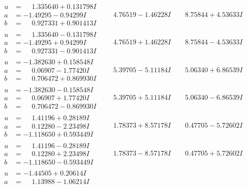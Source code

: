 \documentclass[1p]{elsarticle_modified}
\theoremstyle{definition}
\begin{document}
$$\begin{array}{c|c|c}
\begin{aligned}
u &= \phantom{-}1.335640 + 0.131798 I \\
a &= -1.49295 - 0.94299 I \\
b &= \phantom{-}0.927331 + 0.901413 I\end{aligned}
 & \phantom{-}4.76519 - 1.46228 I & \phantom{-}8.75844 + 4.53633 I \\ \hline\begin{aligned}
u &= \phantom{-}1.335640 - 0.131798 I \\
a &= -1.49295 + 0.94299 I \\
b &= \phantom{-}0.927331 - 0.901413 I\end{aligned}
 & \phantom{-}4.76519 + 1.46228 I & \phantom{-}8.75844 - 4.53633 I \\ \hline\begin{aligned}
u &= -1.382630 + 0.158548 I \\
a &= \phantom{-}0.06907 - 1.77420 I \\
b &= \phantom{-}0.706472 + 0.869930 I\end{aligned}
 & \phantom{-}5.39705 - 5.11184 I & \phantom{-}5.06340 + 6.86539 I \\ \hline\begin{aligned}
u &= -1.382630 - 0.158548 I \\
a &= \phantom{-}0.06907 + 1.77420 I \\
b &= \phantom{-}0.706472 - 0.869930 I\end{aligned}
 & \phantom{-}5.39705 + 5.11184 I & \phantom{-}5.06340 - 6.86539 I \\ \hline\begin{aligned}
u &= \phantom{-}1.41196 + 0.28189 I \\
a &= \phantom{-}0.12280 - 2.23498 I \\
b &= -1.118650 + 0.593449 I\end{aligned}
 & \phantom{-}1.78373 + 8.57178 I & \phantom{-}0.47705 - 5.72602 I \\ \hline\begin{aligned}
u &= \phantom{-}1.41196 - 0.28189 I \\
a &= \phantom{-}0.12280 + 2.23498 I \\
b &= -1.118650 - 0.593449 I\end{aligned}
 & \phantom{-}1.78373 - 8.57178 I & \phantom{-}0.47705 + 5.72602 I \\ \hline\begin{aligned}
u &= -1.44505 + 0.20614 I \\
a &= \phantom{-}1.13988 - 1.06214 I \\

\end{aligned}
\end{array}$$
\end{document}
